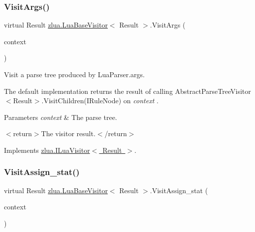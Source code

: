 \subsubsection{\texorpdfstring{Visit\+Args()}{VisitArgs()}}
{\footnotesize\ttfamily virtual Result \mbox{\hyperlink{classzlua_1_1_lua_base_visitor}{zlua.\+Lua\+Base\+Visitor}}$<$ Result $>$.Visit\+Args (\begin{DoxyParamCaption}\item[{\mbox{[}\+Not\+Null\mbox{]} \mbox{\hyperlink{classzlua_1_1_lua_parser_1_1_args_context}{Lua\+Parser.\+Args\+Context}}}]{context }\end{DoxyParamCaption})\hspace{0.3cm}{\ttfamily [virtual]}}



Visit a parse tree produced by Lua\+Parser.\+args. 

The default implementation returns the result of calling Abstract\+Parse\+Tree\+Visitor$<$\+Result$>$.\+Visit\+Children(\+I\+Rule\+Node) on {\itshape context} . 


\begin{DoxyParams}{Parameters}
{\em context} & The parse tree.\\
\hline
\end{DoxyParams}
$<$return$>$The visitor result.$<$/return$>$ 

Implements \mbox{\hyperlink{interfacezlua_1_1_i_lua_visitor_afa6af1e3dc7c517b12ee24b253c6f70f}{zlua.\+I\+Lua\+Visitor$<$ Result $>$}}.

\mbox{\label{classzlua_1_1_lua_base_visitor_a803c8c7b10f83503634a866019163d28}} 
\subsubsection{\texorpdfstring{Visit\+Assign\+\_\+stat()}{VisitAssign\_stat()}}
{\footnotesize\ttfamily virtual Result \mbox{\hyperlink{classzlua_1_1_lua_base_visitor}{zlua.\+Lua\+Base\+Visitor}}$<$ Result $>$.Visit\+Assign\+\_\+stat (\begin{DoxyParamCaption}\item[{\mbox{[}\+Not\+Null\mbox{]} \mbox{\hyperlink{classzlua_1_1_lua_parser_1_1_assign__stat_context}{Lua\+Parser.\+Assign\+\_\+stat\+Context}}}]{context }\end{DoxyParamCaption})\hspace{0.3cm}{\ttfamily [virtual]}}



